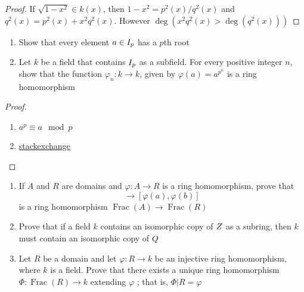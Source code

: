 \documentclass[11pt]{article}
\DeclareMathOperator{\Frac}{Frac}
\begin{document}
\begin{proof}
If \(\sqrt{1-x^2}\in k(x)\), then \(1-x^2=p^2(x)/q^2(x)\) and 
\(q^2(x)=p^2(x)+x^2q^2(x)\). However \(\deg(x^2q^2(x)>\deg(q^2(x)))\)
\end{proof}

\begin{exercise}
\label{ex3.45}
\begin{enumerate}
\item Show that every element \(a\in\relax{I}_p\) has a \(p\)th root
\item Let \(k\) be a field that contains \(\relax{I}_p\) as a subfield. For every
positive integer \(n\), show that the function
\(\varphi_n:k\to k\), given by \(\varphi(a)=a^{p^n}\) is a ring homomorphism
\end{enumerate}
\end{exercise}

\begin{proof}
\begin{enumerate}
\item \(a^p\equiv a\mod p\)
\item \href{https://math.stackexchange.com/questions/565135/finite-fields-existence-of-field-of-order-pn-proof-help}{stackexchange}
\end{enumerate}
\end{proof}

\begin{exercise}
\label{ex3.47}
\begin{enumerate}
\item If \(A\) and \(R\) are domains and \(\varphi:A\to R\) is a ring homomorphism,
prove that 
\begin{equation*}
[a,b]\to [\varphi(a),\varphi(b)]
\end{equation*}
is a ring homomorphism \(\Frac(A)\to\Frac(R)\)
\item Prove that if a field \(k\) contains an isomorphic copy of \(\relax{Z}\) as a
subring, then \(k\) must contain an isomorphic copy of \(\relax{Q}\)
\item Let \(R\) be a domain and let \(\varphi:R\to k\) be an injective ring
homomorphism, where \(k\) is a field. Prove that there exists a unique ring
homomorphism \(\Phi:\Frac(R)\to k\) extending \(\varphi\) ; that is, \(\Phi|R=\varphi\)
\end{enumerate}
\end{exercise}
\end{document}
